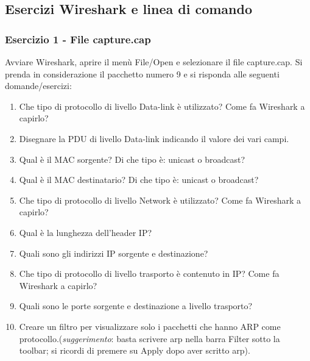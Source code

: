 \documentclass[a4paper]{article}
\begin{document}
	\subsection[\textcolor{Red3}{\textbf{Esercizi}} Wireshark e linea di comando]{Esercizi Wireshark e linea di comando}
	
	\subsubsection{Esercizio 1 - File \textsf{capture.cap}}
	
	Avviare Wireshark, aprire il menù \textsf{File/Open} e selezionare il file \textsf{capture.cap}.\newline
	Si prenda in considerazione il pacchetto numero 9 e si risponda alle seguenti domande/esercizi:
	\begin{enumerate}
		\item Che tipo di protocollo di livello Data-link è utilizzato? Come fa Wireshark a capirlo?
		
		\item Disegnare la PDU di livello Data-link indicando il valore dei vari campi.
		
		\item Qual è il MAC sorgente? Di che tipo è: unicast o broadcast?
		
		\item Qual è il MAC destinatario? Di che tipo è: unicast o broadcast?
		
		\item Che tipo di protocollo di livello Network è utilizzato? Come fa Wireshark a capirlo?
		
		\item Qual è la lunghezza dell'header IP?
		
		\item Quali sono gli indirizzi IP sorgente e destinazione?
		
		\item Che tipo di protocollo di livello trasporto è contenuto in IP? Come fa Wireshark a capirlo?
		
		\item Quali sono le porte sorgente e destinazione a livello trasporto?
		
		\item Creare un filtro per visualizzare solo i pacchetti che hanno ARP come protocollo.\newline (\emph{suggerimento}: basta scrivere \textsf{arp} nella barra \textsf{Filter} sotto la toolbar; si ricordi di premere su \textsf{Apply} dopo aver scritto \textsf{arp}).
		

\end{enumerate}
\end{document}
